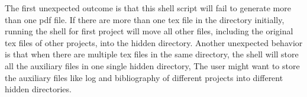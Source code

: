 \documentclass[10pt,a4paper]{article}
\begin{document}
\noindent The first unexpected outcome is that this shell script will fail to generate more than one pdf file. If there are more than one tex file in the directory initially, running the shell for first project will move all other files, including the original tex files of other projects, into the hidden directory. Another unexpected behavior is that when there are multiple tex files in the same directory, the shell will store all the auxiliary files in one single hidden directory, The user might want to store the auxiliary files like log and bibliography of different projects into different hidden directories. 
\end{document}
